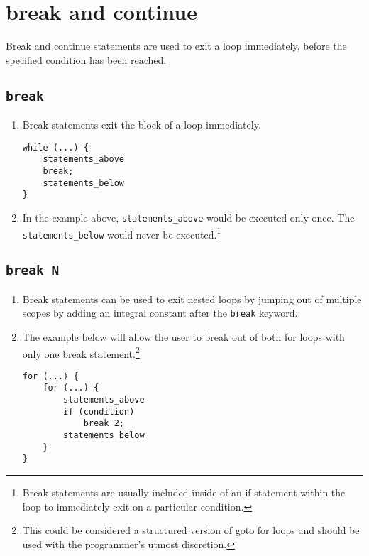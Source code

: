 \section{break and continue}
\label{sec:breaks}
Break and continue statements are used to exit a loop immediately, before the specified condition has been reached.

\subsection{\texorpdfstring{\lstinline|break|}{break}}
\begin{enumerate}
	\item Break statements exit the block of a loop immediately.
\begin{lstlisting}[numbers=none]
while (...) {
	statements_above
	break; 
	statements_below
}
\end{lstlisting}
	\item In the example above, \lstinline|statements_above| would be executed only once. The \lstinline|statements_below| would never be executed.\footnote{Break statements are usually included inside of an if statement within the loop to immediately exit on a particular condition.}
\end{enumerate}

\subsection{\texorpdfstring{\lstinline|break N|}{break N}}
\begin{enumerate}
	\item Break statements can be used to exit nested loops by jumping out of multiple scopes by adding an integral constant after the \lstinline|break| keyword.
	\item The example below will allow the user to break out of both for loops with only one break statement.\footnote{This could be considered a structured version of goto for loops and should be used with the programmer's utmost discretion.}
\begin{lstlisting}[numbers=none]
for (...) {
	for (...) {
		statements_above
		if (condition)
			break 2;
		statements_below
	}
}
\end{lstlisting}
\end{enumerate} 


